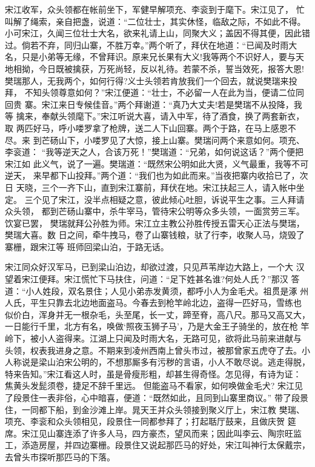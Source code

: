 宋江收军，众头领都在帐前坐下，军健早解项充、李衮到于麾下。宋江见了，
忙叫解了绳索，亲自把盏，说道：“二位壮士，其实休怪，临敌之际，不如此不得。
小可宋江，久闻三位壮士大名，欲来礼请上山，同聚大义；盖因不得其便，因此错
过。倘若不弃，同归山寨，不胜万幸。”两个听了，拜伏在地道：“已闻及时雨大
名，只是小弟等无缘，不曾拜识。原来兄长果有大义!我等两个不识好人，要与天
地相拗，今日既被擒获，万死尚轻，反以礼待。若蒙不杀，誓当效死，报答大恩!
樊瑞那人，无我两个，如何行得?义士头领若肯放我们一个回去，就说樊瑞来投拜，
不知头领尊意如何？”宋江便道：“壮士，不必留一人在此为当，便请二位同回贵
寨。宋江来日专候佳音。”两个拜谢道：“真乃大丈夫!若是樊瑞不从投降，我等
擒来，奉献头领麾下。”宋江听说大喜，请入中军，待了酒食，换了两套新衣，取
两匹好马，呼小喽罗拿了枪牌，送二人下山回寨。两个于路，在马上感恩不尽。来
到芒砀山下，小喽罗见了大惊，接上山寨。樊瑞问两个来意如何。项充、李衮道：
“我等逆天之人，合该万死！”樊瑞道：“兄弟，如何说这话？”两个便把宋江如
此义气，说了一遍。樊瑞道：“既然宋公明如此大贤，义气最重，我等不可逆天，
来早都下山投拜。”两个道：“我们也为如此而来。”当夜把寨内收拾已了，次日
天晓，三个一齐下山，直到宋江寨前，拜伏在地。宋江扶起三人，请入帐中坐定。
三个见了宋江，没半点相疑之意，彼此倾心吐胆，诉说平生之事。三人拜请众头领，
都到芒砀山寨中，杀牛宰马，管待宋公明等众多头领，一面赏劳三军。饮宴已罢，
樊瑞就拜公孙胜为师。宋江立主教公孙胜传授五雷天心正法与樊瑞，樊瑞大喜。数
日之间，牵牛拽马，卷了山寨钱粮，驮了行李，收聚人马，烧毁了寨栅，跟宋江等
班师回梁山泊，于路无话。

宋江同众好汉军马，已到梁山泊边，却欲过渡，只见芦苇岸边大路上，一个大
汉望着宋江便拜。宋江慌忙下马扶住，问道：“足下姓甚名谁?何处人氏？”那汉
答道：“小人姓段，双名景住；人见小弟赤发黄须，都呼小人为金毛犬。祖贯是涿
州人氏，平生只靠去北边地面盗马。今春去到枪竿岭北边，盗得一匹好马，雪练也
似价白，浑身并无一根杂毛，头至尾，长一丈，蹄至脊，高八尺。那马又高又大，
一日能行千里，北方有名，唤做‘照夜玉狮子马’，乃是大金王子骑坐的，放在枪
竿岭下，被小人盗得来。江湖上只闻及时雨大名，无路可见，欲将此马前来进献与
头领，权表我进身之意。不期来到凌州西南上曾头市过，被那曾家五虎夺了去。小
人称说是梁山泊宋公明的，不想那厮多有污秽的言语，小人不敢尽说。逃走得脱，
特来告知。”宋江看这人时，虽是骨瘦形粗，却甚生得奇怪。怎见得，有诗为证：
焦黄头发髭须卷，捷足不辞千里远。
但能盗马不看家，如何唤做金毛犬?
宋江见了段景住一表非俗，心中暗喜，便道：“既然如此，且同到山寨里商议。”
带了段景住，一同都下船，到金沙滩上岸。晁天王并众头领接到聚义厅上，宋江教
樊瑞、项充、李衮和众头领相见，段景住一同都参拜了；打起聒厅鼓来，且做庆贺
筵席。宋江见山寨连添了许多人马，四方豪杰，望风而来；因此叫李云、陶宗旺监
工，添造房屋，并四边寨栅。段景住又说起那匹马的好处，宋江叫神行太保戴宗，
去曾头市探听那匹马的下落。

